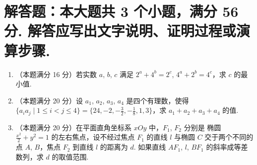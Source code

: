 \documentclass{chsmc}
\begin{document}
\section{解答题：本大题共 3 个小题，满分 56 分. 解答应写出文字说明、证明过程或演算步骤.}

\begin{enumerate}[resume]
  \item （本题满分 16 分）若实数 $a$, $b$, $c$ 满足 $2^a+4^b = 2^c$,
    $4^a+2^b = 4^c$，求 $c$ 的最小值.
  \item （本题满分 20 分）设 $a_1$, $a_2$, $a_3$, $a_4$ 是四个有理数，使得 $\{ a_ia_j\mid 1\leq i<j\leq 4\} = \{24,-2,-\frac32,-\frac18,1,3\}$，求 $a_1+a_2+a_3+a_4$ 的值.
  \item （本题满分 20 分）在平面直角坐标系 $xOy$ 中，$F_1$, $F_2$ 分别是
    椭圆 $\frac{x^2}{2}+y^2 = 1$ 的左右焦点，设不经过焦点 $F_1$ 的直线 $l$
    与椭圆 $C$ 交于两个不同的点 $A$, $B$，焦点 $F_2$ 到直线 $l$ 的距离为 $d$.
    如果直线 $AF_1$, $l$, $BF_1$ 的斜率成等差数列，求 $d$ 的取值范围.
\end{enumerate}
\end{document}
